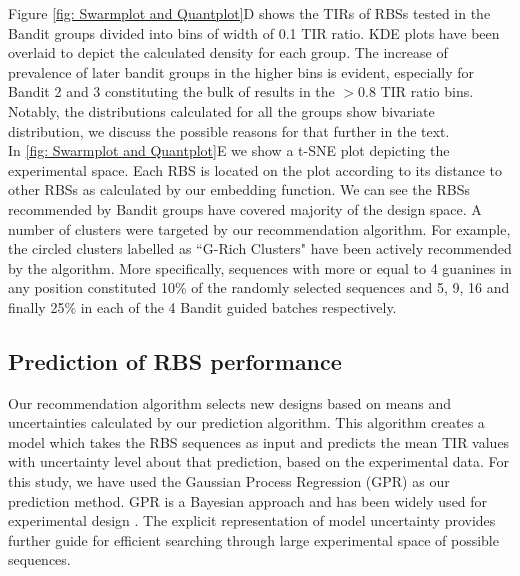 \documentclass{article}
\begin{document}
Figure \ref{fig: Swarmplot and Quantplot}D shows the TIRs of RBSs tested in the Bandit groups divided into bins of width of 0.1 TIR ratio.
KDE plots have been overlaid to depict the calculated density for each group.
The increase of prevalence of later bandit groups in the higher bins is evident, especially for Bandit 2 and 3 constituting the bulk of results in the $>0.8$ TIR ratio bins.
Notably, the distributions calculated for all the groups show bivariate distribution, we discuss the possible reasons for that further in the text.\\

In \ref{fig: Swarmplot and Quantplot}E we show a t-SNE plot depicting the experimental space.
Each RBS is located on the plot according to its distance to other RBSs as calculated by our embedding function.
We can see the RBSs recommended by Bandit groups have covered majority of the design space. 
A number of clusters were targeted by our recommendation algorithm.
For example, the circled clusters labelled as ``G-Rich Clusters" have been actively recommended by the algorithm.
More specifically, sequences with more or equal to 4 guanines in any position constituted 10\% of the randomly selected sequences and 5, 9, 16 and finally 25\% in each of the 4 Bandit guided batches respectively.

\subsection{Prediction of RBS performance}

Our recommendation algorithm selects new designs based on means and uncertainties calculated by our prediction algorithm.
This algorithm creates a model which takes the RBS sequences as input and predicts the mean TIR values with uncertainty level about that prediction, based on the experimental data.
For this study, we have used the Gaussian Process Regression (GPR) as our prediction method.
GPR is a Bayesian approach and has been widely used for experimental design \cite{srinivas2012information, romero_navigating_2013}.
The explicit representation of model uncertainty provides further guide for efficient searching through large experimental space of possible sequences.\\
\end{document}
